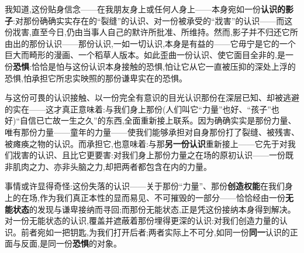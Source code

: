 \dmark{}我知道,这份贴身信念——在我朋友身上或任何人身上——本身宛如一份\textbf{认识的}\textbf{影子}:对那份确确实实存在的“裂缝”的认识、对一份被承受的“戕害”的认识——而这份戕害,直至今日,仍由当事人自己的默许所批准、所维持。然而,影子并不归还它所由出的那份认识——那份认识,一如一切认识,本身是有益的——它毋宁是它的一个巨大而畸形的漫画、一个稻草人版本。如此歪曲一份认识、使它面目全非的,是一份\textbf{恐惧}:恰恰是怕与这份认识本身接触的恐惧,怕让它从它一直被压抑的深处上浮的恐惧,怕承担它所忠实映照的那份谦卑实在的恐惧。

与这份可畏的认识接触、以一份完全有意识的目光认识那份在深层已知、却被逃避的实在——这才真正意味着:与我们身上那份(人们叫它“力量”也好、“孩子”也好)“自信已亡故一生之久”的东西,全面重新接上联系。因为确确实实是那份力量、唯有那份力量——童年的力量——使我们能够承担对自身那份打了裂缝、被残害、被瘫痪之物的认识。而承担它,也意味着:与那\textbf{另一份认识}重新接上——它先于对我们戕害的认识、且比它更要害:对我们身上那份力量之在场的原初认识——一份既非肌肉之力、亦非头脑之力,却把两者都包含在内的力量。

事情或许显得奇怪:这份失落的认识——关于那份“力量”、那份\textbf{创造权能}在我们身上的在场,作为我们真正本性的显而易见、不可摧毁的一部分——恰恰经由一份\textbf{无能状态}的发现与谦卑接纳而寻回;而那份无能状态,正是凭这份接纳本身得到解决。对一份无能状态的认识,覆盖并遮蔽着那份埋得更深的认识:对我们创造力量的认识。前者宛如一把钥匙,为我们打开后者;两者实际上不可分,如同一份\textbf{同一}认识的正面与反面,是同一份\textbf{恐惧}的对象。

